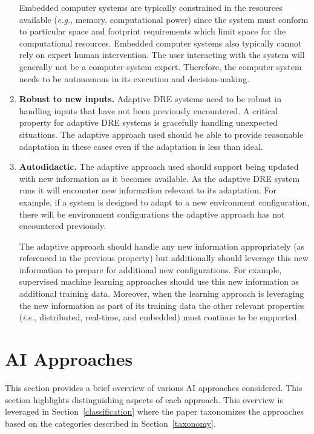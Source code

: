 \documentclass[conference]{IEEEtran}
\begin{document}
\begin{enumerate}
Embedded computer systems are typically constrained in the resources available (\emph{e.g.}, memory, computational power) since the system must conform to particular space and footprint requirements which limit space for the computational resources. Embedded computer systems also typically cannot rely on expert human intervention. The user interacting with the system will generally not be a computer system expert. Therefore, the computer system needs to be autonomous in its execution and decision-making.

\item \textbf{Robust to new inputs.} Adaptive DRE systems need to be robust in handling inputs that have not been previously encountered. A critical property for adaptive DRE systems is gracefully handling unexpected situations. The adaptive approach used should be able to provide reasonable adaptation in these cases even if the adaptation is less than ideal.

\item \textbf{Autodidactic.} %
The adaptive approach used should support being updated with new information as it becomes available. As the adaptive DRE system runs
it will encounter new information relevant to its adaptation. For example, if a system
is designed to adapt to a new environment configuration, there will be environment
configurations the adaptive approach has not encountered previously.

The adaptive approach should handle any new information appropriately (as referenced in the previous property) but additionally should
leverage this new information to prepare for additional new configurations. For example, supervised
machine learning approaches should use this new information as additional training data.
Moreover, when the learning approach is leveraging the new information as part of its training data the other relevant properties (\emph{i.e.}, distributed, real-time, and embedded) must continue to be supported.

\end{enumerate}

\section{AI Approaches}
\label{ml-approaches}

This section provides a brief overview of various AI approaches considered. This section highlights distinguishing aspects of each approach.
This overview is leveraged in Section~\ref{classification} where the paper
taxonomizes the approaches based on the categories described in
Section~\ref{taxonomy}.
\end{document}

